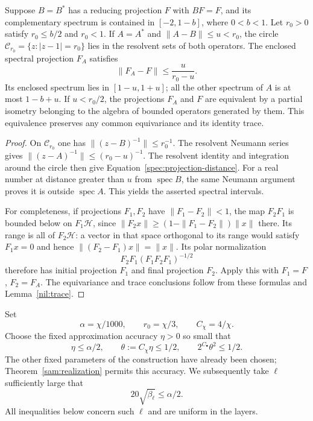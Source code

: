 \begin{lemma}
\label{spec:perturbation}
Suppose $B=B^*$ has a reducing projection $F$ with $BF=F$, and its
complementary spectrum is contained in $[-2,1-b]$, where $0<b<1$.
Let $r_0>0$ satisfy $r_0\leq b/2$ and $r_0<1$.  If
$A=A^*$ and $\|A-B\|\leq u<r_0$, the circle
$\mathcal C_{r_0}=\{z:|z-1|=r_0\}$ lies in the resolvent sets of both
operators.  The enclosed spectral projection $F_A$ satisfies
\begin{equation}
 \|F_A-F\|\leq\frac{u}{r_0-u}.
 \label{spec:projection-distance}
\end{equation}
Its enclosed spectrum lies in $[1-u,1+u]$; all the other spectrum of $A$
is at most $1-b+u$.  If $u<r_0/2$, the projections $F_A$ and $F$ are
equivalent by a partial isometry belonging to the algebra of bounded
operators generated by them.  This equivalence preserves any common
equivariance and its identity trace.
\end{lemma}

\begin{proof}
On $\mathcal C_{r_0}$ one has
$\|(z-B)^{-1}\|\leq r_0^{-1}$.  The resolvent Neumann series gives
$\|(z-A)^{-1}\|\leq(r_0-u)^{-1}$.  The resolvent identity and integration
around the circle then give Equation~\eqref{spec:projection-distance}.
For a real number at distance greater than $u$ from $\operatorname{spec}B$,
the same Neumann argument proves it is outside $\operatorname{spec}A$.
This yields the asserted spectral intervals.

For completeness, if projections $F_1,F_2$ have $\|F_1-F_2\|<1$, the map
$F_2F_1$ is bounded below on $F_1\mathcal H$, since
$\|F_2x\|\geq(1-\|F_1-F_2\|)\|x\|$ there.  Its range is all of
$F_2\mathcal H$: a vector in that space orthogonal to its range would
satisfy $F_1x=0$ and hence $\|(F_2-F_1)x\|=\|x\|$.  Its polar
normalization
\[
 F_2F_1(F_1F_2F_1)^{-1/2}
\]
therefore has initial projection $F_1$ and final projection $F_2$.
Apply this with $F_1=F$, $F_2=F_A$.  The equivariance and trace conclusions
follow from these formulas and Lemma~\ref{nil:trace}.
\end{proof}

Set
\begin{equation}
       \alpha=\chi/1000,\qquad r_0=\chi/3,
       \qquad C_\chi=4/\chi.
 \label{spec:accuracy-constants}
\end{equation}
Choose the fixed approximation accuracy $\eta>0$ so small that
\begin{equation}
 \eta\leq\alpha/2,\qquad
 \theta:=C_\chi\eta\leq1/2,\qquad
        2^{C_\bullet}\theta^2\leq1/2.
 \label{spec:eta-choice}
\end{equation}
The other fixed parameters of the construction have already been chosen;
Theorem~\ref{sam:realization} permits this accuracy.  We subsequently take
$\ell$ sufficiently large that
\begin{equation}
       20\sqrt{\beta_\ell}\leq\alpha/2.
 \label{spec:deletion-choice}
\end{equation}
All inequalities below concern such $\ell$ and are uniform in the layers.

